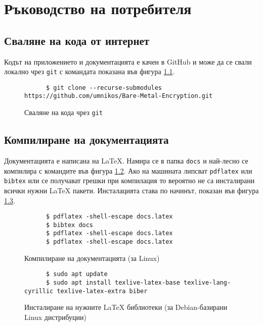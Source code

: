 \chapter{Ръководство на потребителя}
  \section{Сваляне на кода от интернет}
  Кодът на приложението и документацията е качен в GitHub и може да се свали локално чрез {\tt git} с командата показана във фигура \ref{fig:repo-download}.
  \begin{figure}[htpb]
    \centering
    \begin{verbatim}
      $ git clone --recurse-submodules https://github.com/umnikos/Bare-Metal-Encryption.git
    \end{verbatim}
    \caption{Сваляне на кода чрез {\tt git}}
    \label{fig:repo-download}
  \end{figure}

  \section{Компилиране на документацията}
  Документацията е написана на \LaTeX{}. Намира се в папка {\tt docs} и най-лесно се компилира с командите във фигура \ref{fig:latex-compiling}. Ако на машината липсват {\tt pdflatex} или {\tt bibtex} или се получават грешки при компилация то вероятно не са инсталирани всички нужни \LaTeX{} пакети. Инсталацията става по начинът, показан във фигура \ref{fig:latex-requirements}.
  \begin{figure}[htpb]
    \centering
    \begin{verbatim}
      $ pdflatex -shell-escape docs.latex
      $ bibtex docs
      $ pdflatex -shell-escape docs.latex
      $ pdflatex -shell-escape docs.latex
    \end{verbatim}
    \caption{Компилиране на документацията (за Linux)}
    \label{fig:latex-compiling}
  \end{figure}
  \begin{figure}[htpb]
    \centering
    \begin{verbatim}
      $ sudo apt update
      $ sudo apt install texlive-latex-base texlive-lang-cyrillic texlive-latex-extra biber
    \end{verbatim}
    \caption{Инсталиране на нужните \LaTeX{} библиотеки (за Debian-базирани Linux дистрибуции)}
    \label{fig:latex-requirements}
  \end{figure}

